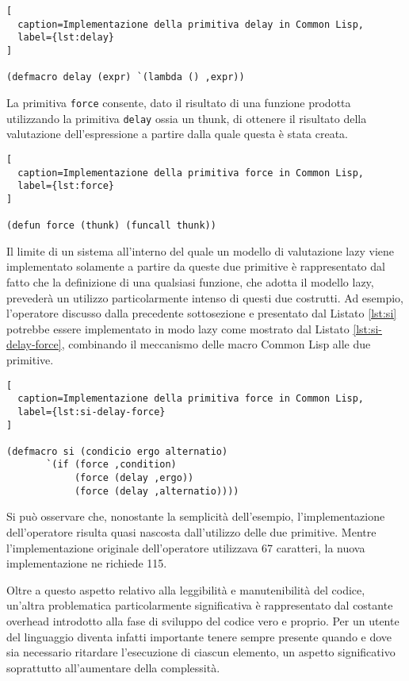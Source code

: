 \begin{lstlisting}[
  caption=Implementazione della primitiva delay in Common Lisp,
  label={lst:delay}
]

(defmacro delay (expr) `(lambda () ,expr))

\end{lstlisting}

La primitiva \texttt{force} consente, dato il risultato di una funzione prodotta
utilizzando la primitiva \texttt{delay} ossia un thunk, di ottenere il risultato
della valutazione dell'espressione a partire dalla quale questa è stata creata.

\begin{lstlisting}[
  caption=Implementazione della primitiva force in Common Lisp,
  label={lst:force}
]

(defun force (thunk) (funcall thunk))

\end{lstlisting}

Il limite di un sistema all'interno del quale un modello di valutazione lazy
viene implementato solamente a partire da queste due primitive è rappresentato
dal fatto che la definizione di una qualsiasi funzione, che adotta il modello
lazy, prevederà un utilizzo particolarmente intenso di questi due costrutti. Ad
esempio, l'operatore discusso dalla precedente sottosezione e presentato dal
Listato \ref{lst:si} potrebbe essere implementato in modo lazy come mostrato dal
Listato \ref{lst:si-delay-force}, combinando il meccanismo delle macro Common
Lisp alle due primitive.

\begin{lstlisting}[
  caption=Implementazione della primitiva force in Common Lisp,
  label={lst:si-delay-force}
]

(defmacro si (condicio ergo alternatio)
       `(if (force ,condition)
            (force (delay ,ergo))
            (force (delay ,alternatio))))

\end{lstlisting}

Si può osservare che, nonostante la semplicità dell'esempio, l'implementazione
dell'operatore risulta quasi nascosta dall'utilizzo delle due primitive. Mentre
l'implementazione originale dell'operatore utilizzava 67 caratteri, la nuova
implementazione ne richiede 115.

Oltre a questo aspetto relativo alla leggibilità e manutenibilità del codice,
un'altra problematica particolarmente significativa è rappresentato dal costante
overhead introdotto alla fase di sviluppo del codice vero e proprio. Per un
utente del linguaggio diventa infatti importante tenere sempre presente quando e
dove sia necessario ritardare l'esecuzione di ciascun elemento, un aspetto
significativo soprattutto all'aumentare della complessità.

